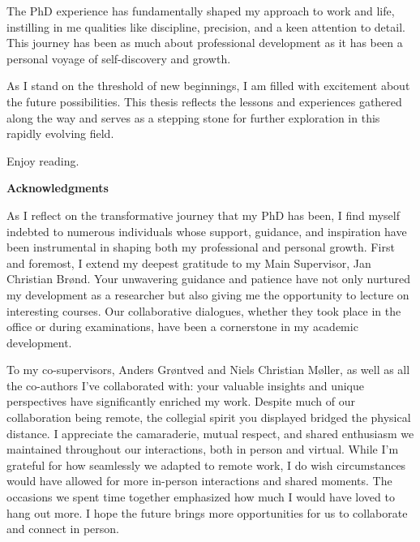 \documentclass[
  10pt,
]{scrbook}
\let\originaltextbf\textbf
\renewcommand{\textbf}[1]{\textcolor{color1}{\textsf{\originaltextbf{#1}}}}
\begin{document}
The PhD experience has fundamentally shaped my approach to work and life, instilling in me qualities like discipline, precision, and a keen attention to detail. This journey has been as much about professional development as it has been a personal voyage of self-discovery and growth.

As I stand on the threshold of new beginnings, I am filled with excitement about the future possibilities. This thesis reflects the lessons and experiences gathered along the way and serves as a stepping stone for further exploration in this rapidly evolving field.

Enjoy reading.

\newpage

  
\textcolor{color1}{\textsf{\textbf{\Large{Acknowledgments}}}}

\vspace*{\baselineskip}

As I reflect on the transformative journey that my PhD has been, I find myself indebted to numerous individuals whose support, guidance, and inspiration have been instrumental in shaping both my professional and personal growth.
First and foremost, I extend my deepest gratitude to my Main Supervisor, Jan Christian Brønd. Your unwavering guidance and patience have not only nurtured my development as a researcher but also giving me the opportunity to lecture on interesting courses. Our collaborative dialogues, whether they took place in the office or during examinations, have been a cornerstone in my academic development.

To my co-supervisors, Anders Grøntved and Niels Christian Møller, as well as all the co-authors I've collaborated with: your valuable insights and unique perspectives have significantly enriched my work. Despite much of our collaboration being remote, the collegial spirit you displayed bridged the physical distance. I appreciate the camaraderie, mutual respect, and shared enthusiasm we maintained throughout our interactions, both in person and virtual. While I'm grateful for how seamlessly we adapted to remote work, I do wish circumstances would have allowed for more in-person interactions and shared moments. The occasions we spent time together emphasized how much I would have loved to hang out more. I hope the future brings more opportunities for us to collaborate and connect in person.
\end{document}
